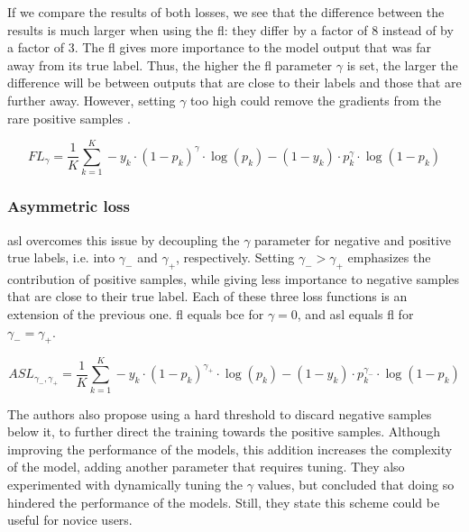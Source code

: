 If we compare the results of both losses, we see that the difference between the results is much larger when using the \acrshort{fl}: they differ by a factor of 8 instead of by a factor of 3. The \acrshort{fl} gives more importance to the model output that was far away from its true label. Thus, the higher the \acrshort{fl} parameter $\gamma$ is set, the larger the difference will be between outputs that are close to their labels and those that are further away. However, setting $\gamma$ too high could remove the gradients from the rare positive samples \cite{ben2020asymmetric}.

$$ FL_\gamma = \frac{1}{K} \sum_{k=1}^K -y_k \cdot (1-p_k)^\gamma \cdot \log (p_k) - (1-y_k)\cdot p_k^\gamma \cdot \log (1-p_k) $$

\subsubsection{Asymmetric loss}

\acrfull{asl} overcomes this issue by decoupling the $\gamma$ parameter for negative and positive true labels, i.e. into $\gamma_-$ and $\gamma_+$, respectively. Setting $\gamma_- > \gamma_+$ emphasizes the contribution of positive samples, while giving less importance to negative samples that are close to their true label. Each of these three loss functions is an extension of the previous one. \acrshort{fl} equals \acrshort{bce} for $\gamma=0$, and \acrshort{asl} equals \acrshort{fl} for $\gamma_- = \gamma_+$.

$$ ASL_{\gamma_-,\gamma_+} = \frac{1}{K} \sum_{k=1}^K -y_k \cdot (1-p_k)^{\gamma_+} \cdot \log (p_k) - (1-y_k)\cdot p_k^{\gamma_-} \cdot \log (1-p_k) $$

The authors also propose using a hard threshold to discard negative samples below it, to further direct the training towards the positive samples. Although improving the performance of the models, this addition increases the complexity of the model, adding another parameter that requires tuning. They also experimented with dynamically tuning the $\gamma$ values, but concluded that doing so hindered the performance of the models. Still, they state this scheme could be useful for novice users.